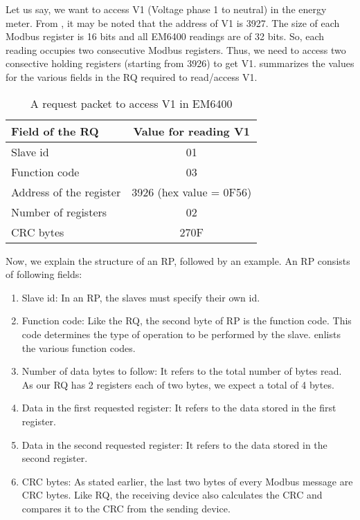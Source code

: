 Let us say, we want to access V1 (Voltage phase 1 to neutral) in the
energy meter. From , it may be noted that the address of V1 is 3927. The size of each Modbus register is 16 bits and all EM6400 readings
are of 32 bits. So, each reading occupies two consecutive Modbus
registers. Thus, we need to access two consective holding registers
(starting from 3926) to get V1.  summarizes the
values for the various fields in the RQ required to read/access V1.
\begin{table}
  \centering
  \caption{A request packet to access V1 in EM6400}
  \label{tab:params-rq}
  \begin{tabular}{lc}\hline
    Field of the RQ         & Value for reading V1    \\ \hline
    Slave id                & 01                      \\
    Function code           & 03                      \\
    Address of the register & 3926 (hex value = 0F56) \\
    Number of registers     & 02                      \\
    CRC bytes               & 270F                    \\
    \hline
  \end{tabular}
\end{table}
Now, we explain the structure of an RP, followed by an example.
An RP consists of following fields:
\begin{enumerate}
  \item Slave id: In an RP, the slaves must specify their own id.
  \item Function code: Like the RQ, the second byte of RP is the function code.
        This code determines the type of operation to be
        performed by the slave.  enlists the various
        function codes.
  \item Number of data bytes to follow: It refers to the total number of bytes
        read. As our RQ has 2 registers each of two bytes, we expect a total of 4 bytes.
  \item Data in the first requested register: It refers to the data stored
        in the first register.
  \item Data in the second requested register: It refers to the data stored
        in the second register.
  \item CRC bytes: As stated earlier, the last two bytes of every Modbus message are CRC
        bytes. Like RQ, the receiving device also calculates the CRC and compares it to the
        CRC from the sending device.
\end{enumerate}
